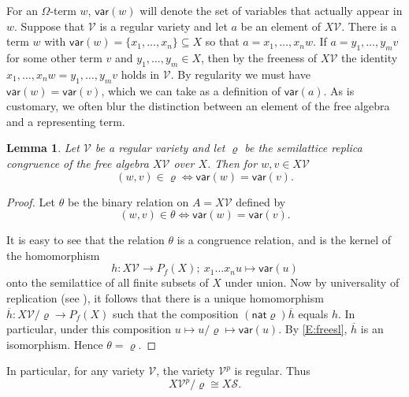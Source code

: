 \documentclass{birkau}
\newcommand{\mcV}{\mathcal{V}}
\newcommand{\mcS}{\mathcal{S}}
\def\mf{\mathsf}
\newcommand{\pro}[1]{{#1}^p}
\theoremstyle{plain}
\newtheorem{lemma}[theorem]{Lemma}
\theoremstyle{definition}
\numberwithin{equation}{section}
\begin{document}
For an $\Omega$-term $w$,  $\mf{var}(w)$ will denote the set of variables that actually
appear in  $w$. Suppose that $\mcV$ is a regular variety and let $a$ be an element of
$X\mcV$. There is a term $w$ with  $\mf{var}(w) = \{x_1,\dots, x_n\} \subseteq X$ so that
$a=x_1,\dots,x_nw$. If $a=y_1,\dots,y_mv$ for some other term $v$ and $y_1,\dots, y_m
\in X$,  then by the freeness of $X\mcV$ the identity $x_1,\dots,x_nw = y_1,\dots,
y_mv$ holds in $\mcV$. By regularity we must have $\mf{var}(w) = \mf{var}(v)$, which we can take
as a definition of $\mf{var}(a)$. As is customary, we often blur the distinction between
an element of the free algebra and a representing term.


\begin{lemma}\label{L:freereg}
  Let $\mcV$ be a regular variety and let $\varrho$ be the
  semilattice replica congruence of the free algebra $X\mcV$ over $X$. Then for $w,v \in X\mcV$
  \begin{equation*}
(w,v) \in \varrho \iff \mf{var}(w) = \mf{var}(v).
\end{equation*}
\end{lemma}
\begin{proof}
Let $\theta$ be the binary relation on $A = X\mcV$ defined by
\begin{equation*}
(w,v) \in \theta \iff \mf{var}(w) = \mf{var}(v).
\end{equation*}

It is easy to see that the relation $\theta$ is a congruence relation, and is the kernel of
the homomorphism
\begin{equation*}
h \colon X\mcV \rightarrow P_f(X);\ x_1 \dots x_n u \mapsto \mf{var}(u)
\end{equation*}
onto the semilattice of all finite subsets of $X$ under union.  Now by universality of
replication (see \cite[Lemma~3.3.1]{RS02}), it follows that there is a unique homomorphism
$\overline{h}\colon X\mcV/\varrho \rightarrow P_f(X)$ such that the composition
$(\mf{nat}\varrho)\overline{h}$ equals $h$. In particular, under this composition
$u \mapsto u/\varrho \mapsto \mf{var}(u)$.  By \eqref{E:freesl}, $\overline{h}$ is an
isomorphism. Hence $\theta = \varrho$.
\end{proof}

In particular, for any variety $\mcV$, the variety $\pro{\mcV}$ is regular. Thus
\begin{equation}\label{E:replP}
X\pro{\mcV}/\varrho \cong X\mcS.
\end{equation}
\end{document}
